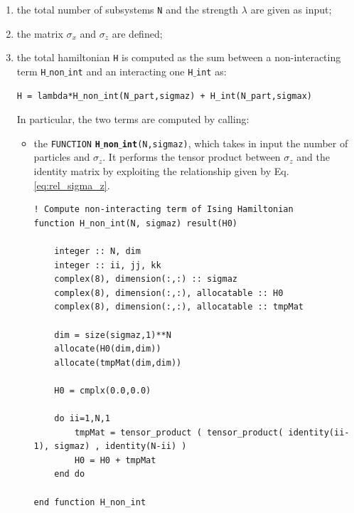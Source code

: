 \documentclass[rmp,10pt,onecolumn,fleqn,notitlepage]{revtex4-1}
\begin{document}
\begin{enumerate}

\item the total number of subsystems \texttt{N} and the strength \( \lambda  \) are given as input;

\item the matrix \( \sigma _x \) and \( \sigma _z \) are defined;

\item the total hamiltonian \texttt{H} is computed as the sum between a non-interacting term \texttt{H$\_$non$\_$int} and an interacting one \texttt{H$\_$int} as:

\begin{minipage}[t]{0.65\linewidth}%
\begin{lstlisting}[style=Fortran]
H = lambda*H_non_int(N_part,sigmaz) + H_int(N_part,sigmax)\end{lstlisting}
\end{minipage}

In particular, the two terms are computed by calling:
\begin{itemize}

\item the \texttt{FUNCTION} {\bfseries\texttt{H$\_$non$\_$int}}\texttt{(N,sigmaz)}, which takes in input the number of particles and \( \sigma _z \). It performs the tensor product between \( \sigma _z \) and the identity matrix by exploiting the relationship given by Eq. \eqref{eq:rel_sigma_z}.

\begin{minipage}[t]{0.98\linewidth}%
\begin{lstlisting}[style=Fortran]
! Compute non-interacting term of Ising Hamiltonian
function H_non_int(N, sigmaz) result(H0)

    integer :: N, dim
    integer :: ii, jj, kk
    complex(8), dimension(:,:) :: sigmaz
    complex(8), dimension(:,:), allocatable :: H0
    complex(8), dimension(:,:), allocatable :: tmpMat

    dim = size(sigmaz,1)**N
    allocate(H0(dim,dim))
    allocate(tmpMat(dim,dim))

    H0 = cmplx(0.0,0.0)

    do ii=1,N,1
        tmpMat = tensor_product ( tensor_product( identity(ii-1), sigmaz) , identity(N-ii) )
        H0 = H0 + tmpMat
    end do

end function H_non_int\end{lstlisting}
\end{minipage}


\end{itemize}
\end{enumerate}
\end{document}

